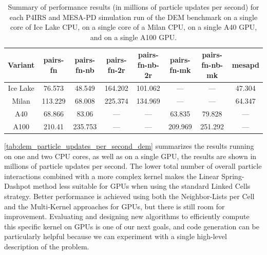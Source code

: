 \documentclass[Afour,sageh,times]{sagej}
\newcommand{\RMchange}[1]{{\color{blue} #1}}
\begin{document}
\begin{table}[htb]
    \centering
    \begin{tabular}{c|c|c|c|c|c|c|c}
        Variant & pairs-fn & pairs-fn-nb & pairs-fn-2r & pairs-fn-nb-2r & pairs-fn-mk & pairs-fn-nb-mk & mesapd \\
        \hline
        Ice Lake & 76.573 & 48.549 & 164.202 & 101.062 & --- & --- & 47.304 \\
        Milan & 113.229 & 68.008 & 225.374 & 134.969 & --- & --- & 64.347 \\
        A40 & 68.866 & 83.06 & --- & --- & 63.835 & 79.828 & --- \\
        A100 & 210.41 & 235.753 & --- & --- & 209.969 & 251.292 & --- \\
    \end{tabular}
    \caption{\RMchange{Summary of performance results (in millions of particle updates per second) for each P4IRS and MESA-PD simulation run of the DEM benchmark on a single core of Ice Lake CPU, on a single core of a Milan CPU, on a single A40 GPU, and on a single A100 GPU.}}
    \label{tab:dem_particle_updates_per_second_dem}
\end{table}

\RMchange{\autoref{tab:dem_particle_updates_per_second_dem} summarizes the results running on one and two CPU cores, as well as on a single GPU, the results are shown in millions of particle updates per second.
The lower total number of overall particle interactions combined with a more complex kernel makes the Linear Spring-Dashpot method less suitable for GPUs when using the standard Linked Cells strategy.
Better performance is achieved using both the Neighbor-Lists per Cell and the Multi-Kernel approaches for GPUs, but there is still room for improvement.
Evaluating and designing new algorithms to efficiently compute this specific kernel on GPUs is one of our next goals, and code generation can be particularly helpful because we can experiment with a single high-level description of the problem.}
\end{document}
